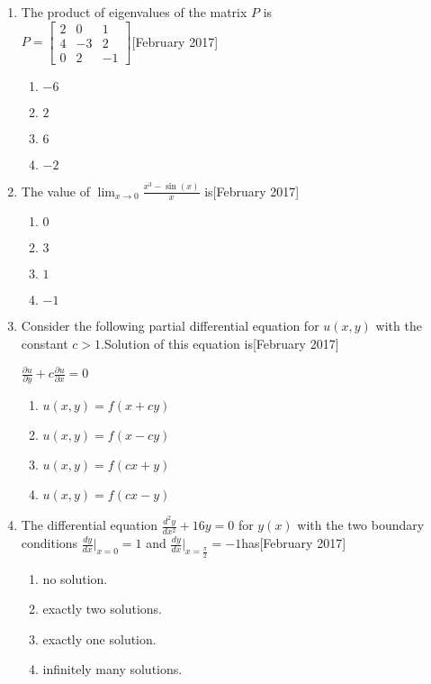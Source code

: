 \documentclass[journal]{IEEEtran}
\begin{document}
\begin{enumerate}
\item The product of eigenvalues of the matrix $P$ is \\
$P = \begin{bmatrix} 2 & 0 & 1 \\ 4 & -3 & 2 \\ 0 & 2 & -1 \end{bmatrix}$\hfill[February 2017]
\begin{enumerate}
    \item $-6$
    \item $2$
    \item $6$
    \item $-2$
\end{enumerate}
\item The value of $ \lim_{x \to 0} \frac{x^3 - \sin(x)}{x} $ is\hfill[February 2017]
\begin{enumerate}
    \item $0$
    \item $3$
    \item $1$
    \item $-1$
\end{enumerate}
\item Consider the following partial differential equation for  $u(x, y)$ with the \\ constant $c > 1$.Solution of this equation is\hfill[February 2017]
\begin{center}
$\frac{\partial u}{\partial y} + c \frac{\partial u}{\partial x} = 0$
\end{center}
\begin{enumerate}
    \item$ u(x, y) = f(x + cy)$
    \item$ u(x, y) = f(x - cy) $
    \item$ u(x, y) = f(cx + y) $
    \item$ u(x, y) = f(cx - y) $
\end{enumerate}
\item The differential equation $ \frac{d^2 y}{dx^2} + 16y = 0 $ for $y(x)$ with the two boundary conditions $\frac{dy}{dx}\big|_{x=0} = 1 $ and $\frac{dy}{dx}\big|_{x=\frac{\pi}{2}} = -1 $has\hfill[February 2017]
\begin{enumerate}
    \item no solution.
    \item exactly two solutions.
    \item exactly one solution.
    \item infinitely many solutions.

\end{enumerate}
\end{enumerate}
\end{document}
